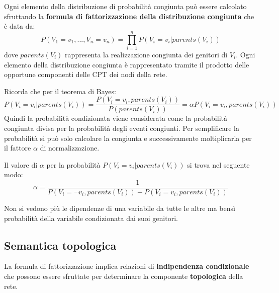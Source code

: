 Ogni elemento della distribuzione di probabilità congiunta può essere calcolato
sfruttando la \textbf{formula di fattorizzazione della distribuzione congiunta}
che è data da:
\begin{equation}
    P(V_1 = v_1,...,V_n = v_n) = \prod_{i=1}^{n} P(V_i=v_i|parents(V_i))
\end{equation}
dove $parents(V_i)$ rappresenta la realizzazione congiunta dei genitori di $V_i$.
Ogni elemento della distribuzione congiunta è rappresentato tramite il prodotto
delle opportune componenti delle CPT dei nodi della rete.
\begin{nota}
    Ricorda che per il teorema di Bayes:
    \begin{equation*}
        P(V_i = v_i|parents(V_i)) = \frac{P(V_i = v_i,parents(V_i))}{P(parents(V_i))}
        = \alpha P(V_i = v_i,parents(V_i))
    \end{equation*}
    Quindi la probabilità condizionata viene considerata come la probabilità
    congiunta divisa per la probabilità degli eventi congiunti. Per semplificare
    la probabilità si può solo calcolare la congiunta e successivamente moltiplicarla
    per il fattore $\alpha$ di normalizzazione.

    Il valore di $\alpha$ per la probabilità $P(V_i=v_i|parents(V_i))$ si trova
    nel seguente modo:
    \begin{equation*}
        \alpha = \frac{1}{P(V_i = \lnot v_i, parents(V_i)) + P(V_i = v_i,parents(V_i))}
    \end{equation*}
\end{nota}
\begin{nota}
    Non si vedono più le dipendenze di una variabile da tutte le altre ma bensì
    probabilità della variabile condizionata dai suoi genitori.
\end{nota}
\subsection{Semantica topologica}
La formula di fattorizzazione implica relazioni di \textbf{indipendenza condizionale}
che possono essere sfruttate per determinare la componente \textbf{topologica}
della rete.

